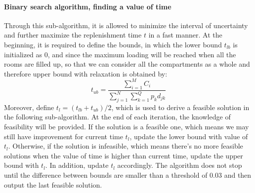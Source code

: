 \documentclass{article}
\begin{document}
\paragraph{Binary search algorithm, finding a value of time} Through this sub-algorithm, it is allowed to minimize the interval of uncertainty and further maximize the replenishment time $t$ in a fast manner. At the beginning, it is required to define the bounds, in which the lower bound $t_{lb}$ is initialized as 0, and since the maximum loading will be reached when all the rooms are filled up, so that we can consider all the compartments as a whole and therefore upper bound with relaxation is obtained by:
\begin{equation}
t_{ub} = \frac{\sum _{i=1}^{M}C_i}{\sum _{j=1}^{N}\sum _{k=1}^{Q}p_kd_{jk}}
\end{equation}
Moreover, define $t_l=(t_{lb}+t_{ub})/2$, which is used to derive a feasible solution in the following sub-algorithm. At the end of each iteration, the knowledge of feasibility will be provided. If the solution is a feasible one, which means we may still have improvement for current time $t_l$, update the lower bound with value of $t_l$. Otherwise, if the solution is infeasible, which means there's no more feasible solutions when the value of time is higher than current time, update the upper bound with $t_l$. In addition, update $t_l$ accordingly. The algorithm does not stop until the difference between bounds are smaller than a threshold of 0.03 and then output the last feasible solution.
\end{document}
